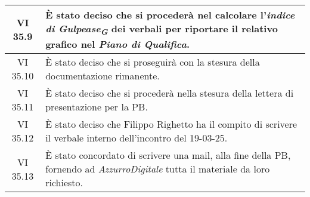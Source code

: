 \begin{table}[htbp]
\begin{tabular}{|c|p{}|}
        \hline
        VI 35.9 & È stato deciso che si procederà nel calcolare l'\emph{indice di Gulpease}\textsubscript{\textit{\textbf{G}}} dei verbali per riportare il relativo grafico nel \emph{Piano di Qualifica}.\\
        \hline
        VI 35.10 & È stato deciso che si proseguirà con la stesura della documentazione rimanente.\\
        \hline
        VI 35.11 & È stato deciso che si procederà nella stesura della lettera di presentazione per la PB.\\
        \hline
        VI 35.12 & È stato deciso che Filippo Righetto ha il compito di scrivere il verbale interno dell'incontro del 19-03-25.\\
        \hline
        VI 35.13 & È stato concordato di scrivere una mail, alla fine della PB, fornendo ad \emph{AzzurroDigitale} tutta il materiale da loro richiesto.\\
        \hline
    \end{tabular}
\end{table}


